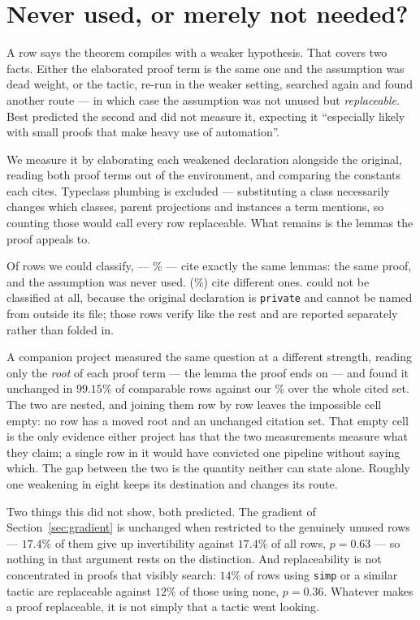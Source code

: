 \documentclass[11pt]{article}
\begin{document}
\section{Never used, or merely not needed?}\label{sec:unused}

A row says the theorem compiles with a weaker hypothesis. That covers two facts.
Either the elaborated proof term is the same one and the assumption was dead
weight, or the tactic, re-run in the weaker setting, searched again and found
another route --- in which case the assumption was not unused but
\emph{replaceable}. Best predicted the second and did not measure it, expecting
it ``especially likely with small proofs that make heavy use of automation''.

We measure it by elaborating each weakened declaration alongside the original,
reading both proof terms out of the environment, and comparing the constants
each cites. Typeclass plumbing is excluded --- substituting a class necessarily
changes which classes, parent projections and instances a term mentions, so
counting those would call every row replaceable. What remains is the lemmas the
proof appeals to.

Of \classifiedCount{} rows we could classify, \unusedCount{} ---
\unusedPercent{}\% --- cite exactly the same lemmas: the same proof, and the
assumption was never used. \replaceableCount{} (\replaceablePercent{}\%) cite
different ones. \unclassifiedCount{} could not be classified at all, because the
original declaration is \texttt{private} and cannot be named from outside its
file; those rows verify like the rest and are reported separately rather than
folded in.


A companion project \cite{companion} measured the same question at a different
strength, reading only the \emph{root} of each proof term --- the lemma the proof ends on --- and
found it unchanged in $99.15\%$ of comparable rows against our
\unusedPercent{}\% over the whole cited set. The two are nested, and joining
them row by row leaves the impossible cell empty: no row has a moved root and an
unchanged citation set. That empty cell is the only evidence either project has
that the two measurements measure what they claim; a single row in it would have
convicted one pipeline without saying which. The gap between the two is the
quantity neither can state alone. Roughly one weakening in eight keeps its
destination and changes its route.

Two things this did not show, both predicted. The gradient of
Section~\ref{sec:gradient} is unchanged when restricted to the genuinely unused
rows --- $17.4\%$ of them give up invertibility against $17.4\%$ of all rows,
$p = 0.63$ --- so nothing in that argument rests on the distinction. And
replaceability is not concentrated in proofs that visibly search: $14\%$ of
rows using \texttt{simp} or a similar tactic are replaceable against $12\%$ of
those using none, $p = 0.36$. Whatever makes a proof replaceable, it is not
simply that a tactic went looking.
\end{document}
